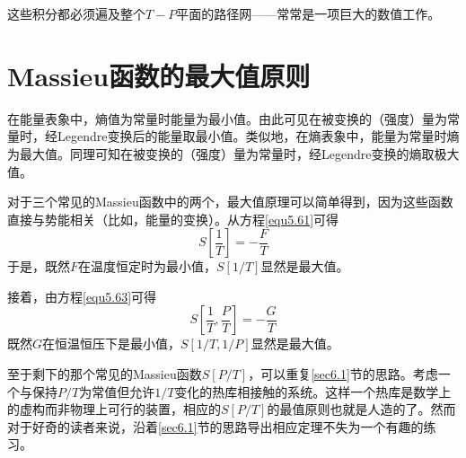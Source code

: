 这些积分都必须遍及整个$T-P$平面的路径网——常常是一项巨大的数值工作。

\section{Massieu函数的最大值原则}
\label{sec6.7}
在能量表象中，熵值为常量时能量为最小值。由此可见在被变换的（强度）量为常量时，经Legendre变换后的能量取最小值。类似地，在熵表象中，能量为常量时熵为最大值。同理可知在被变换的（强度）量为常量时，经Legendre变换的熵取极大值。%

对于三个常见的Massieu函数中的两个，最大值原理可以简单得到，因为这些函数直接与势能相关（比如，能量的变换）。从方程\eqref{equ5.61}可得
\begin{equation}
	S\left[\frac{1}{T}\right]=-\frac{F}{T}
\end{equation}
于是，既然$F$在温度恒定时为最小值，$S[1/T]$显然是最大值。

接着，由方程\eqref{equ5.63}可得
\begin{equation}
	S\left[\frac{1}{T},\frac{P}{T}\right]=-\frac{G}{T}
\end{equation}
既然$G$在恒温恒压下是最小值，$S[1/T,1/P]$显然是最大值。

至于剩下的那个常见的Massieu函数$S[P/T]$，可以重复\ref{sec6.1}节的思路。考虑一个与保持$P/T$为常值但允许$1/T$变化的热库相接触的系统。这样一个热库是数学上的虚构而非物理上可行的装置，相应的$S[P/T]$的最值原则也就是人造的了。然而对于好奇的读者来说，沿着\ref{sec6.1}节的思路导出相应定理不失为一个有趣的练习。
